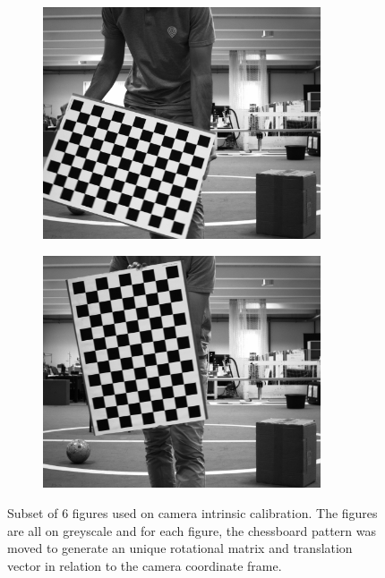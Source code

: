 \begin{figure}[!ht]
\begin{subfigure}[c]{0.30\textwidth}
		\includegraphics[width=0.9\textwidth]{img/camera-calibration/left-0044.png}
	\end{subfigure}
	\begin{subfigure}[c]{0.30\textwidth}
		\includegraphics[width=0.9\textwidth]{img/camera-calibration/left-0048.png}
	\end{subfigure}
	
	\caption{Subset of 6 figures used on camera intrinsic calibration. The figures are all on greyscale and for each figure, the chessboard pattern was moved to generate an unique rotational matrix and translation vector in relation to the camera coordinate frame.}
	\label{fig:camera-calibration-images}
\end{figure}

